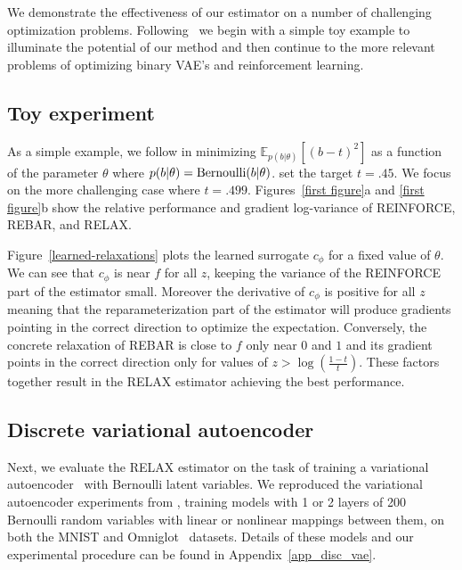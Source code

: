 \documentclass{article}
\newcommand{\RELAX}{{\textnormal{RELAX}}}
\begin{document}
%
We demonstrate the effectiveness of our estimator on a number of challenging optimization problems. Following~\citet{tucker2017rebar} we begin with a simple toy example to illuminate the potential of our method and then continue to the more relevant problems of optimizing binary VAE's and reinforcement learning.

\subsection{Toy experiment}
As a simple example, we follow \citet{tucker2017rebar} in minimizing $\mathbb{E}_{p(b|\theta)}[(b - t)^2]$ as a function of the parameter $\theta$ where {$p(b|\theta) = \textnormal{Bernoulli}(b|\theta)$}.
\citet{tucker2017rebar} set the target $t = .45$.
We focus on the more challenging case where $t = .499$.
Figures~\ref{first figure}a and \ref{first figure}b show the relative performance and gradient log-variance of REINFORCE, REBAR, and RELAX.


Figure~\ref{learned-relaxations} plots the learned surrogate $c_\phi$ for a fixed value of $\theta$. We can see that $c_\phi$ is near $f$ for all $z$, keeping the variance of the REINFORCE part of the estimator small. Moreover the derivative of $c_\phi$ is positive for all $z$ meaning that the reparameterization part of the estimator will produce gradients pointing in the correct direction to optimize the expectation. Conversely, the concrete relaxation of REBAR is close to $f$ only near $0$ and $1$ and its gradient points in the correct direction only for values of $z > \log (\frac{1-t}{t})$. These factors together result in the RELAX estimator achieving the best performance. 

\subsection{Discrete variational autoencoder}
\label{vae section}
Next, we evaluate the \RELAX{} estimator on the task of training a variational autoencoder~\citep{kingma2013autoencoding, rezende2014stochastic} with Bernoulli latent variables.
We reproduced the variational autoencoder experiments from \citet{tucker2017rebar}, training models with 1 or 2 layers of 200 Bernoulli random variables with linear or nonlinear mappings between them, on both  the MNIST and Omniglot~\citep{lake2015human} datasets.
Details of these models and our experimental procedure can be found in Appendix~\ref{app_disc_vae}.
\end{document}
